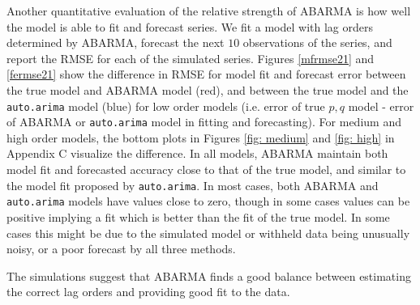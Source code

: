 Another quantitative evaluation of the relative strength of ABARMA is how well the model is able to fit and forecast series. We fit a model with lag orders determined by ABARMA, forecast the next $10$ observations of the series, and report the RMSE for each of the simulated series.  Figures \ref{mfrmse21} and \ref{fermse21} show the difference in RMSE for model fit and forecast error between the true model and ABARMA model (red), and between the true model and the {\tt auto.arima} model (blue) for low order models (i.e. error of true $p,q$ model - error of ABARMA or {\tt auto.arima} model in fitting and forecasting). For medium and high order models, the bottom plots in Figures \ref{fig: medium} and \ref{fig: high} in Appendix C visualize the difference.  In all models, ABARMA maintain both model fit and forecasted accuracy close to that of the true model, and similar to the model fit proposed by {\tt auto.arima}.  In most cases, both ABARMA and {\tt auto.arima} models have values close to zero, though in some cases values can be positive implying a fit which is better than the fit of the true model.  In some cases this might be due to the simulated model or withheld data being unusually noisy, or a poor forecast by all three methods.

The simulations suggest that ABARMA finds a good balance between estimating the correct lag orders and providing good fit to the data.
\fi

  

